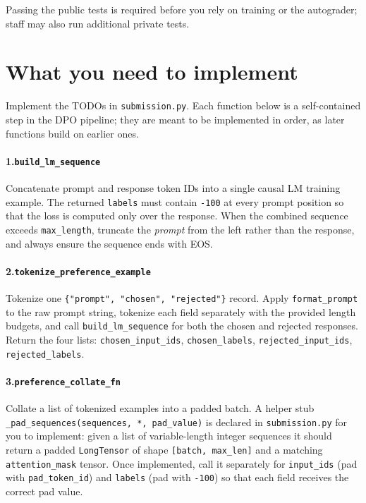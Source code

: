 \documentclass[11pt]{article}
\newcommand{\ignore}{\texttt{-100}}
\begin{document}
Passing the public tests is required before you rely on training or the autograder; staff may also run additional private tests.

\section*{What you need to implement}

Implement the TODOs in \texttt{submission.py}. Each function below is a self-contained step in the DPO pipeline; they are meant to be implemented in order, as later functions build on earlier ones.

\paragraph{1.\enspace\texttt{build\_lm\_sequence}}
Concatenate prompt and response token IDs into a single causal LM training example.
The returned \texttt{labels} must contain \ignore{} at every prompt position so that the
loss is computed only over the response.
When the combined sequence exceeds \texttt{max\_length}, truncate the \emph{prompt} from the
left rather than the response, and always ensure the sequence ends with EOS.

\paragraph{2.\enspace\texttt{tokenize\_preference\_example}}
Tokenize one \texttt{\{"prompt", "chosen", "rejected"\}} record.
Apply \texttt{format\_prompt} to the raw prompt string, tokenize each field separately with
the provided length budgets, and call \texttt{build\_lm\_sequence} for both the chosen and
rejected responses.
Return the four lists: \texttt{chosen\_input\_ids}, \texttt{chosen\_labels},
\texttt{rejected\_input\_ids}, \texttt{rejected\_labels}.

\paragraph{3.\enspace\texttt{preference\_collate\_fn}}
Collate a list of tokenized examples into a padded batch.
A helper stub \texttt{\_pad\_sequences(sequences, *, pad\_value)} is declared in
\texttt{submission.py} for you to implement: given a list of variable-length integer
sequences it should return a padded \texttt{LongTensor} of shape \texttt{[batch, max\_len]}
and a matching \texttt{attention\_mask} tensor.
Once implemented, call it separately for \texttt{input\_ids} (pad with \texttt{pad\_token\_id})
and \texttt{labels} (pad with \ignore{}) so that each field receives the correct pad value.
\end{document}
